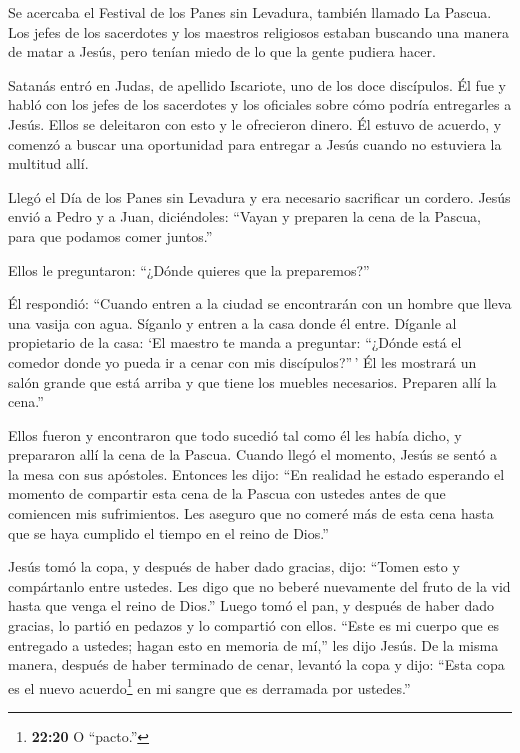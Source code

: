  Se acercaba el Festival de los Panes sin Levadura, también
llamado La Pascua.  Los jefes de los sacerdotes y los
maestros religiosos estaban buscando una manera de matar a Jesús, pero
tenían miedo de lo que la gente pudiera hacer.

 Satanás entró en Judas, de apellido Iscariote, uno de los
doce discípulos.  Él fue y habló con los jefes de los
sacerdotes y los oficiales sobre cómo podría entregarles a Jesús.
 Ellos se deleitaron con esto y le ofrecieron dinero.
 Él estuvo de acuerdo, y comenzó a buscar una oportunidad
para entregar a Jesús cuando no estuviera la multitud allí.

 Llegó el Día de los Panes sin Levadura y era necesario
sacrificar un cordero.  Jesús envió a Pedro y a Juan,
diciéndoles: ``Vayan y preparen la cena de la Pascua, para que podamos
comer juntos.''

 Ellos le preguntaron: ``¿Dónde quieres que la preparemos?''

 Él respondió: ``Cuando entren a la ciudad se encontrarán
con un hombre que lleva una vasija con agua. Síganlo y entren a la casa
donde él entre.  Díganle al propietario de la casa: `El
maestro te manda a preguntar: ``¿Dónde está el comedor donde yo pueda ir
a cenar con mis discípulos?''\,'  Él les mostrará un salón
grande que está arriba y que tiene los muebles necesarios. Preparen allí
la cena.''

 Ellos fueron y encontraron que todo sucedió tal como él
les había dicho, y prepararon allí la cena de la Pascua. 
Cuando llegó el momento, Jesús se sentó a la mesa con sus apóstoles.
Entonces les dijo:  ``En realidad he estado esperando el
momento de compartir esta cena de la Pascua con ustedes antes de que
comiencen mis sufrimientos.  Les aseguro que no comeré más
de esta cena hasta que se haya cumplido el tiempo en el reino de Dios.''

 Jesús tomó la copa, y después de haber dado gracias, dijo:
``Tomen esto y compártanlo entre ustedes.  Les digo que no
beberé nuevamente del fruto de la vid hasta que venga el reino de
Dios.''  Luego tomó el pan, y después de haber dado
gracias, lo partió en pedazos y lo compartió con ellos. ``Este es mi
cuerpo que es entregado a ustedes; hagan esto en memoria de mí,'' les
dijo Jesús.  De la misma manera, después de haber terminado
de cenar, levantó la copa y dijo: ``Esta copa es el nuevo
acuerdo\footnote{\textbf{22:20} O ``pacto.''} en mi sangre que es
derramada por ustedes.''


